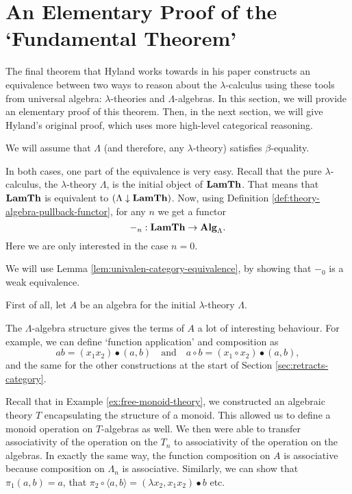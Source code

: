 \section{An Elementary Proof of the `Fundamental Theorem'}\label{sec:elementary-fundamental-theorem}

The final theorem that Hyland works towards in his paper constructs an equivalence between two ways to reason about the $ \lambda $-calculus using these tools from universal algebra: $ \lambda $-theories and $ \Lambda $-algebras. In this section, we will provide an elementary proof of this theorem. Then, in the next section, we will give Hyland's original proof, which uses more high-level categorical reasoning.

We will assume that $ \Lambda $ (and therefore, any $ \lambda $-theory) satisfies $ \beta $-equality.

In both cases, one part of the equivalence is very easy. Recall that the pure $ \lambda $-calculus, the $ \lambda $-theory $ \Lambda $, is the initial object of $ \mathbf{LamTh} $. That means that $ \mathbf{LamTh} $ is equivalent to $ (\Lambda \downarrow \mathbf{LamTh}) $. Now, using Definition \ref{def:theory-algebra-pullback-functor}, for any $ n $ we get a functor
\[ -_n : \mathbf{LamTh} \to \mathbf{Alg}_{\Lambda}. \]
Here we are only interested in the case $ n = 0 $.

We will use Lemma \ref{lem:univalen-category-equivalence}, by showing that $ -_0 $ is a weak equivalence.

First of all, let $ A $ be an algebra for the initial $ \lambda $-theory $ \Lambda $.

The $ \Lambda $-algebra structure gives the terms of $ A $ a lot of interesting behaviour. For example, we can define `function application' and composition as
\[ a b = (x_1 x_2) \bullet (a, b) \quad \text{and} \quad a \circ b = (x_1 \circ x_2) \bullet (a, b), \]
and the same for the other constructions at the start of Section \ref{sec:retracts-category}.

\begin{remark}
  Recall that in Example \ref{ex:free-monoid-theory}, we constructed an algebraic theory $ T $ encapsulating the structure of a monoid. This allowed us to define a monoid operation on $ T $-algebras as well. We then were able to transfer associativity of the operation on the $ T_n $ to associativity of the operation on the algebras. In exactly the same way, the function composition on $ A $ is associative because composition on $ \Lambda_n $ is associative. Similarly, we can show that $ \pi_1 (a, b) = a $, that $ \pi_2 \circ \langle a, b \rangle = (\lambda x_2, x_1 x_2) \bullet b $ etc.
\end{remark}

